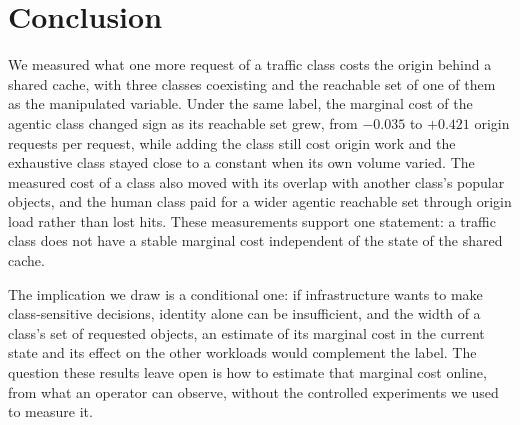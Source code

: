\section{Conclusion}\label{sec:conclusion}
We measured what one more request of a traffic class costs the origin behind a shared
cache, with three classes coexisting and the reachable set of one of them as the
manipulated variable.
Under the same label, the marginal cost of the agentic class changed sign as its reachable
set grew, from $-0.035$ to $+0.421$ origin requests per request, while adding the class
still cost origin work and the exhaustive class stayed close to a constant when its own
volume varied.
The measured cost of a class also moved with its overlap with another class's popular
objects, and the human class paid for a wider agentic reachable set through origin load
rather than lost hits.
These measurements support one statement: a traffic class does not have a stable marginal
cost independent of the state of the shared cache.

The implication we draw is a conditional one: if infrastructure wants to make
class-sensitive decisions, identity alone can be insufficient, and the width of a class's
set of requested objects, an estimate of its marginal cost in the current state and its
effect on the other workloads would complement the label.
The question these results leave open is how to estimate that marginal cost online, from
what an operator can observe, without the controlled experiments we used to measure
it.
